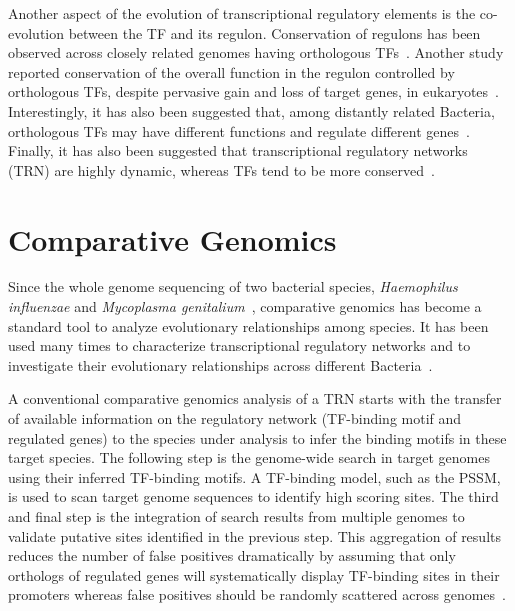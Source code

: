 Another aspect of the evolution of transcriptional regulatory elements is the
co-evolution between the TF and its regulon. Conservation of regulons has been
observed across closely related genomes having orthologous
TFs~\citep{mironov1999computer, tan2001comparative}. Another study reported
conservation of the overall function in the regulon controlled by orthologous
TFs, despite pervasive gain and loss of target genes, in
eukaryotes~\citep{habib2012functional}. Interestingly, it has also been
suggested that, among distantly related Bacteria, orthologous TFs may have
different functions and regulate different
genes~\citep{price2007orthologous}. Finally, it has also been suggested that
transcriptional regulatory networks (TRN) are highly dynamic, whereas TFs tend to
be more conserved~\citep{babu2006evolutionary, chavez2006bacterial}.

\section{Comparative Genomics}

Since the whole genome sequencing of two bacterial species, \textit{Haemophilus
  influenzae} and \textit{Mycoplasma genitalium}~\citep{fleischmann1995whole,
  fraser1995minimal}, comparative genomics has become a standard tool to
analyze evolutionary relationships among species. It has been used many times
to characterize transcriptional regulatory networks and to investigate their
evolutionary relationships across different
Bacteria~\citep{gelfand2000prediction, ravcheev2013genomic,
  meireles2009comparative, kellis2004methods, erill2004differences,
  erill2007aeons, sanchez2012analysis, cornish2012inference}.

A conventional comparative genomics analysis of a TRN starts with the transfer
of available information on the regulatory network (TF-binding motif and
regulated genes) to the species under analysis to infer the binding motifs in
these target species. The following step is the genome-wide search in target
genomes using their inferred TF-binding motifs. A TF-binding model, such as the
PSSM, is used to scan target genome sequences to identify high scoring sites. The
third and final step is the integration of search results from multiple genomes
to validate putative sites identified in the previous step. This aggregation of
results reduces the number of false positives dramatically by assuming that
only orthologs of regulated genes will systematically display TF-binding sites
in their promoters whereas false positives should be randomly scattered across
genomes~\citep{rodionov2007comparative}.


